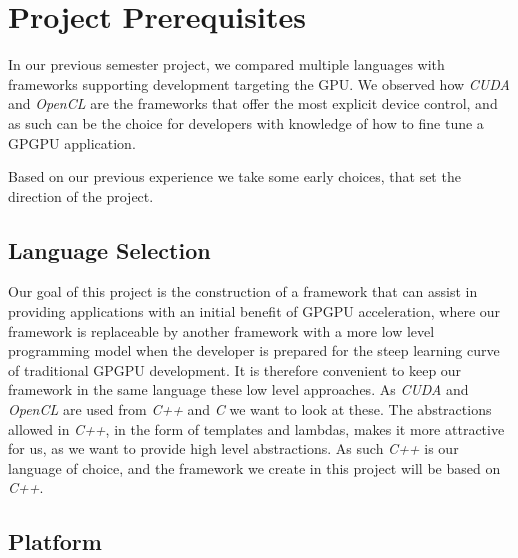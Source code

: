 \section{Project Prerequisites}
In our previous semester project\cite{sw9Report}, we compared multiple languages with frameworks supporting development targeting the GPU. We observed how \textit{CUDA} and \textit{OpenCL} are the frameworks that offer the most explicit device control, and as such can be the choice for developers with knowledge of how to fine tune a GPGPU application.

Based on our previous experience we take some early choices, that set the direction of the project.

\subsection{Language Selection}\label{cha:languageSelection}
Our goal of this project is the construction of a framework that can assist in providing applications with an initial benefit of GPGPU acceleration, where our framework is replaceable by another framework with a more low level programming model when the developer is prepared for the steep learning curve of traditional GPGPU development. It is therefore convenient to keep our framework in the same language these low level approaches. As \textit{CUDA} and \textit{OpenCL} are used from \textit{C++} and \textit{C} we want to look at these. The abstractions allowed in \textit{C++}, in the form of templates and lambdas, makes it more attractive for us, as we want to provide high level abstractions. As such \textit{C++} is our language of choice, and the framework we create in this project will be based on \textit{C++}.

\subsection{Platform}

